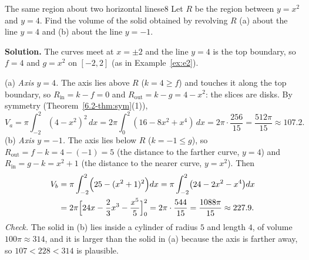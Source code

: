 \documentclass[11pt]{article}
\begin{document}
\begin{exmp}{The same region about two horizontal lines}{e8}
Let $R$ be the region between $y=x^2$ and $y=4$. Find the volume of the solid obtained by revolving $R$ (a) about the line $y=4$ and (b) about the line $y=-1$.

\textbf{Solution.} The curves meet at $x=\pm2$ and the line $y=4$ is the top boundary, so $f=4$ and $g=x^2$ on $[-2,2]$ (as in Example~\ref{ex:e2}).

(a) \emph{Axis $y=4$.} The axis lies above $R$ ($k=4\ge f$) and touches it along the top boundary, so $R_{\mathrm{in}}=k-f=0$ and $R_{\mathrm{out}}=k-g=4-x^2$: the slices are disks. By symmetry (Theorem~\ref{6.2-thm:sym}(1)),
\[
V_a=\pi\int_{-2}^2(4-x^2)^2\,dx=2\pi\int_0^2(16-8x^2+x^4)\,dx=2\pi\cdot\frac{256}{15}=\frac{512\pi}{15}\approx107.2 .
\]
(b) \emph{Axis $y=-1$.} The axis lies below $R$ ($k=-1\le g$), so $R_{\mathrm{out}}=f-k=4-(-1)=5$ (the distance to the farther curve, $y=4$) and $R_{\mathrm{in}}=g-k=x^2+1$ (the distance to the nearer curve, $y=x^2$). Then
\[
\begin{aligned}V_b&=\pi\int_{-2}^2\Bigl(25-(x^2+1)^2\Bigr)dx=\pi\int_{-2}^2\bigl(24-2x^2-x^4\bigr)dx\\ &=2\pi\Bigl[24x-\frac23x^3-\frac{x^5}5\Bigr]_0^2=2\pi\cdot\frac{544}{15}=\frac{1088\pi}{15}\approx227.9 .
\end{aligned}
\]
\emph{Check.} The solid in (b) lies inside a cylinder of radius $5$ and length $4$, of volume $100\pi\approx314$, and it is larger than the solid in (a) because the axis is farther away, so $107<228<314$ is plausible.


\end{exmp}
\end{document}
